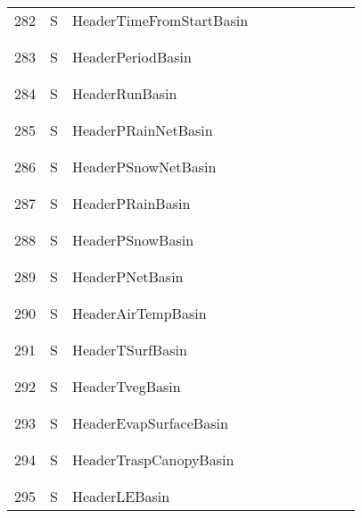 \begin{longtable}{|c|c|l|c|c|c|c|p{}|c|p{}|}
282 & S & HeaderTimeFromStartBasin & & & & & & & \\
&&&&&&&&&\\\hline%
&&&&&&&&&\\
283 & S & HeaderPeriodBasin & & & & & & & \\
&&&&&&&&&\\\hline%
&&&&&&&&&\\
284 & S & HeaderRunBasin & & & & & & & \\
&&&&&&&&&\\\hline%
&&&&&&&&&\\
285 & S & HeaderPRainNetBasin & & & & & & & \\
&&&&&&&&&\\\hline%
&&&&&&&&&\\
286 & S & HeaderPSnowNetBasin & & & & & & & \\
&&&&&&&&&\\\hline%
&&&&&&&&&\\
287 & S & HeaderPRainBasin & & & & & & & \\
&&&&&&&&&\\\hline%
&&&&&&&&&\\
288 & S & HeaderPSnowBasin & & & & & & & \\
&&&&&&&&&\\\hline%
&&&&&&&&&\\
289 & S & HeaderPNetBasin & & & & & & & \\
&&&&&&&&&\\\hline%
&&&&&&&&&\\
290 & S & HeaderAirTempBasin & & & & & & & \\
&&&&&&&&&\\\hline%
&&&&&&&&&\\
291 & S & HeaderTSurfBasin & & & & & & & \\
&&&&&&&&&\\\hline%
&&&&&&&&&\\
292 & S & HeaderTvegBasin & & & & & & & \\
&&&&&&&&&\\\hline%
&&&&&&&&&\\
293 & S & HeaderEvapSurfaceBasin & & & & & & & \\
&&&&&&&&&\\\hline%
&&&&&&&&&\\
294 & S & HeaderTraspCanopyBasin & & & & & & & \\
&&&&&&&&&\\\hline%
&&&&&&&&&\\
295 & S & HeaderLEBasin & & & & & & & \\

\end{longtable}
